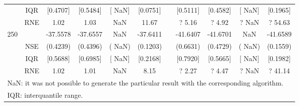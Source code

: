 {{\begin{longtable}{ccccccccccc}
 & IQR & $[$0.4707$]$ & $[$0.5484$]$ & $[$   NaN$]$ & $[$0.0751$]$ & & $[$0.5111$]$ & $[$0.4582$]$  &$[$   NaN$]$ & $[$0.1965$]$  \\  
  & RNE &   1.02 &   1.03 &    NaN &  11.67 &  &?   5.16 & ?   4.92 &  ?    NaN & ?  54.63   \\ [1ex] 
250 & & -37.5578 & -37.6557 &    NaN & -37.6411 & & -41.6407 & -41.6701 &    NaN & -41.6589  \\ 
  & NSE & (0.4239) & (0.4396) & (   NaN) & (0.1203) & & (0.6631) & (0.4729) & (   NaN) & (0.1559)   \\ 
 & IQR & $[$0.5688$]$ & $[$0.6985$]$ & $[$   NaN$]$ & $[$0.2168$]$ & & $[$0.7920$]$ & $[$0.5665$]$  &$[$   NaN$]$ & $[$0.1982$]$  \\  
  & RNE &   1.02 &   1.01 &    NaN &   8.15 &  &?   2.27 & ?   4.47 &  ?    NaN & ?  41.14   \\ [1ex] 
\hline 
  \multicolumn{11}{l}{\footnotesize{NaN: it was not possible to generate the particular result with the corresponding algorithm.}} \\ 
  \multicolumn{11}{l}{\footnotesize{IQR: interquantile range.}} \\ 
\end{longtable} 
} 
} 
